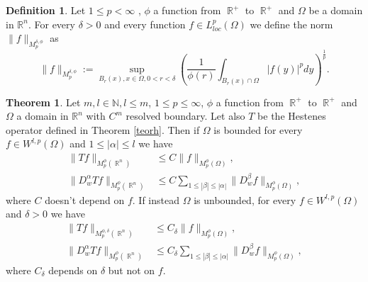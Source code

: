 \documentclass[12pt]{article}
\theoremstyle{definition}
\newtheorem{definition}{Definition}
\newtheorem{theorem}{Theorem}
\DeclareMathOperator\rr{\mathbb{R}}
\begin{document}
\begin{definition}
Let $1\le p< \infty$ , $\phi$ a function from $\rr^+$ to $\rr^+$ and $\Omega$ be a domain in $\mathbb{R}^n$. For every $\delta>0$ and every function $f \in L^p_{loc}(\Omega)$ we define the norm $\|f\|_{M^{\delta,\phi}_p}$ as
\[\| f\|_{M^{\delta,\phi}_p} := \sup_{B_r(x), x \in \Omega, 0<r<\delta} \left(  \frac{1}{\phi(r)}\int_{B_r(x)\cap \Omega} |f(y)|^p dy \right )^{\frac{1}{p}}.\]
\end{definition}



\begin{theorem}
Let $m,l \in \mathbb{N}, l\le m$, $1\le p\le\infty$, $\phi$ a function from $\rr^+$ to $\rr^+$ and $\Omega$ a domain in $\mathbb{R}^n$ with $C^m$ resolved boundary. Let also $ T$ be the Hestenes operator defined in Theorem \ref{teorh}. Then if $\Omega$ is bounded for every $f \in W^{l,p}(\Omega)$ and $1\le |\alpha| \le l$ we have
\begin{align}
\| Tf\|_{M_p^\phi(\rr^n)} &\le    C\| f\|_{M_p^\phi(\Omega)}, \label{b0}\\
\| D^\alpha_w Tf\|_{M_p^\phi(\rr^n)} &\le   C\sum_{1\le |\beta|\le|\alpha| }\| D^\beta_wf\|_{M_p^\phi(\Omega)}, \label{bl}
\end{align}
where  $C$ doesn't depend on $f$. If instead $\Omega$ is unbounded, for every $f \in W^{l,p}(\Omega)$ and $\delta>0$ we have
\begin{align}
\| Tf\|_{M_p^{\phi,\delta}(\rr^n)} &\le    C_\delta\| f\|_{M_p^\phi(\Omega)}, \label{u0} \\
\| D^\alpha_w Tf\|_{M_p^\phi(\rr^n)} &\le   C_\delta\sum_{1\le |\beta|\le|\alpha| }\| D^\beta_wf\|_{M_p^\phi(\Omega)}, \label{ul}
\end{align}
where $C_\delta$ depends on $\delta$ but not on $f.$
\end{theorem}
\end{document}
